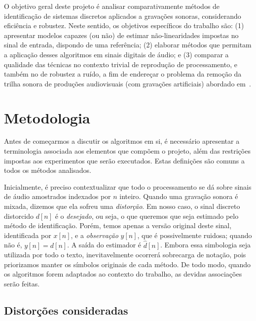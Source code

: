 O objetivo geral deste projeto é analisar comparativamente métodos de identificação de sistemas discretos aplicados a gravações sonoras, considerando eficiência e robustez. Neste sentido, os objetivos específicos do trabalho são: (1) apresentar modelos capazes (ou não) de estimar não-linearidades impostas no sinal de entrada, dispondo de uma referência; (2) elaborar métodos que permitam a aplicação desses algoritmos em sinais digitais de áudio; e (3) comparar a qualidade das técnicas no contexto trivial de reprodução de processamento, e também no de robustez a ruído, a fim de endereçar o problema da remoção da trilha sonora de produções audiovisuais (com gravações artificiais) abordado em~\cite{lordelo-2018}.

\section{Metodologia}

Antes de começarmos a discutir os algoritmos em si, é necessário apresentar a terminologia associada aos elementos que compõem o projeto, além das restrições impostas aos experimentos que serão executados. Estas definições são comuns a todos os métodos analisados.

Inicialmente, é preciso contextualizar que todo o processamento se dá sobre sinais de áudio amostrados indexados por $n$ inteiro. Quando uma gravação sonora é mixada, dizemos que ela sofreu uma \emph{distorção}. Em nosso caso, o sinal discreto distorcido $d[n]$ é o \emph{desejado}, ou seja, o que queremos que seja estimado pelo método de identificação. Porém, temos apenas a versão original deste sinal, identificada por $x[n]$, e a \emph{observação} $y[n]$, que é possivelmente ruidosa; quando não é, $y[n] = d[n]$. A saída do estimador é $\hat{d}[n]$. Embora essa simbologia seja utilizada por todo o texto, inevitavelmente ocorrerá sobrecarga de notação, pois priorizamos manter os símbolos originais de cada método. De todo modo, quando os algoritmos forem adaptados ao contexto do trabalho, as devidas associações serão feitas.


\subsection{Distorções consideradas}
\label{section:intro:distortions}

